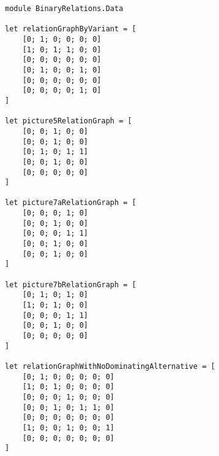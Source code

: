 \documentclass[a4paper,14pt]{extarticle}
\begin{document}
\begin{lstlisting}
module BinaryRelations.Data

let relationGraphByVariant = [
    [0; 1; 0; 0; 0; 0]
    [1; 0; 1; 1; 0; 0]
    [0; 0; 0; 0; 0; 0]
    [0; 1; 0; 0; 1; 0]
    [0; 0; 0; 0; 0; 0]
    [0; 0; 0; 0; 1; 0]
]

let picture5RelationGraph = [
    [0; 0; 1; 0; 0]
    [0; 0; 1; 0; 0]
    [0; 1; 0; 1; 1]
    [0; 0; 1; 0; 0]
    [0; 0; 0; 0; 0]
]

let picture7aRelationGraph = [
    [0; 0; 0; 1; 0]
    [0; 0; 1; 0; 0]
    [0; 0; 0; 1; 1]
    [0; 0; 1; 0; 0]
    [0; 0; 1; 0; 0]
]

let picture7bRelationGraph = [
    [0; 1; 0; 1; 0]
    [1; 0; 1; 0; 0]
    [0; 0; 0; 1; 1]
    [0; 0; 1; 0; 0]
    [0; 0; 0; 0; 0]
]

let relationGraphWithNoDominatingAlternative = [
    [0; 1; 0; 0; 0; 0; 0]
    [1; 0; 1; 0; 0; 0; 0]
    [0; 0; 0; 1; 0; 0; 0]
    [0; 0; 1; 0; 1; 1; 0]
    [0; 0; 0; 0; 0; 0; 0]
    [1; 0; 0; 1; 0; 0; 1]
    [0; 0; 0; 0; 0; 0; 0]
]
\end{lstlisting}
\end{document}

